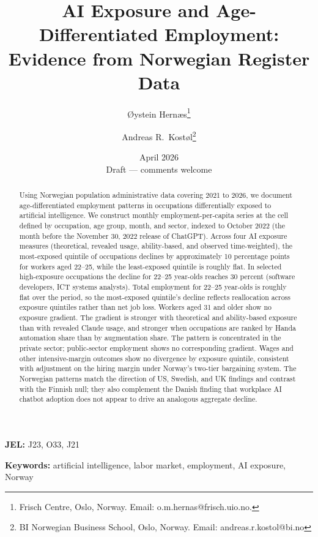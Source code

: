 \documentclass[12pt]{article}
\title{\textbf{AI Exposure and Age-Differentiated Employment:\\Evidence from Norwegian Register Data}}
\author{
  {\O}ystein Hern{\ae}s\thanks{Frisch Centre, Oslo, Norway. Email: o.m.hernas@frisch.uio.no.}
  \and
  Andreas R.\ Kost{\o}l\thanks{BI Norwegian Business School, Oslo, Norway. Email: andreas.r.kostol@bi.no}
}
\date{April 2026\\[6pt]\small Draft --- comments welcome}
\begin{document}
\maketitle

\begin{abstract}
\noindent
Using Norwegian population administrative data covering 2021 to 2026, we document age-differentiated employment patterns in occupations differentially exposed to artificial intelligence. We construct monthly employment-per-capita series at the cell defined by occupation, age group, month, and sector, indexed to October 2022 (the month before the November 30, 2022 release of ChatGPT). Across four AI exposure measures (theoretical, revealed usage, ability-based, and observed time-weighted), the most-exposed quintile of occupations declines by approximately 10 percentage points for workers aged 22--25, while the least-exposed quintile is roughly flat. In selected high-exposure occupations the decline for 22--25 year-olds reaches 30 percent (software developers, ICT systems analysts). Total employment for 22--25 year-olds is roughly flat over the period, so the most-exposed quintile's decline reflects reallocation across exposure quintiles rather than net job loss. Workers aged 31 and older show no exposure gradient. The gradient is stronger with theoretical and ability-based exposure than with revealed Claude usage, and stronger when occupations are ranked by Handa automation share than by augmentation share. The pattern is concentrated in the private sector; public-sector employment shows no corresponding gradient. Wages and other intensive-margin outcomes show no divergence by exposure quintile, consistent with adjustment on the hiring margin under Norway's two-tier bargaining system. The Norwegian patterns match the direction of US, Swedish, and UK findings and contrast with the Finnish null; they also complement the Danish finding that workplace AI chatbot adoption does not appear to drive an analogous aggregate decline.
\end{abstract}

\textbf{JEL:} J23, O33, J21

\textbf{Keywords:} artificial intelligence, labor market, employment, AI exposure, Norway

\clearpage
\setcounter{page}{1}



\end{document}
